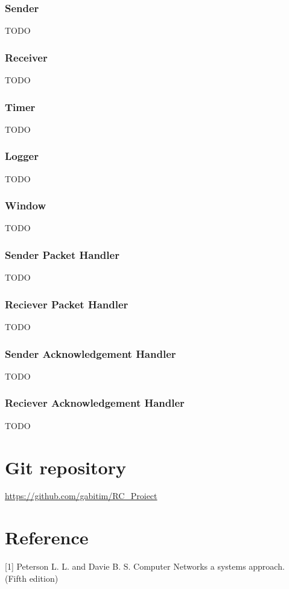 \documentclass[12pt]{article}
\begin{document}
\subsubsection{Sender}

TODO

\subsubsection{Receiver}

TODO

\subsubsection{Timer}

TODO

\subsubsection{Logger}

TODO

\subsubsection{Window}

TODO

\subsubsection{Sender Packet Handler}

TODO

\subsubsection{Reciever Packet Handler}

TODO

\subsubsection{Sender Acknowledgement Handler}

TODO

\subsubsection{Reciever Acknowledgement Handler}

TODO

\section{Git repository}

\url{https://github.com/gabitim/RC_Proiect}

\section{Reference}

\small

[1] Peterson L. L. and Davie B. S. Computer Networks a systems approach. (Fifth edition)
\end{document}
